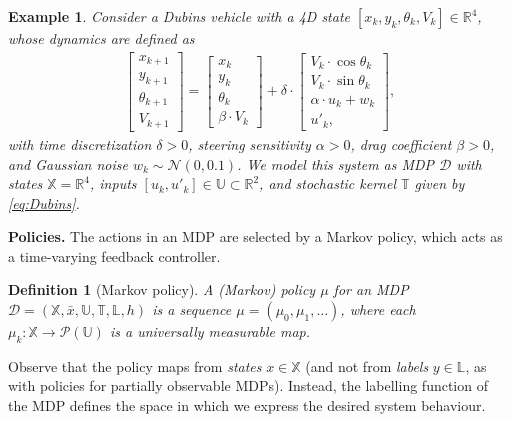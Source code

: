 \documentclass[letterpaper, 10 pt, conference]{ieeeconf}  %
\newtheorem{example}{Example}
\newtheorem{definition}{Definition}
\newcommand*{\policy}{\ensuremath{\mu}}
\newcommand*{\States}{\ensuremath{\mathbb{X}}}
\newcommand*{\Actions}{\ensuremath{\mathbb{U}}}
\newcommand*{\Labels}{\ensuremath{\mathbb{L}}}
\newcommand*{\initState}{\ensuremath{\bar{x}}}
\newcommand*{\transfunc}{\ensuremath{\mathbb{T}}}
\newcommand*{\labelfunc}{\ensuremath{h}}
\newcommand*{\mdp}{\ensuremath{\mathcal{D}}}
\newcommand*{\MDP}{\ensuremath{\tuple{\States,\initState,\Actions,\transfunc,\Labels,\labelfunc}}}
\newcommand*{\RR}{\mathbb{R}}
\newcommand*{\tuple}[1]{\left(#1\right)}
\newcommand*{\distr}[1]{\mathcal{P}(#1)}
\newcommand*{\Gauss}[2]{\ensuremath{\mathcal{N}(#1 , #2)}}
\begin{document}
\begin{example}
    \label{example}
    Consider a Dubins vehicle with a 4D state $[x_k, y_k, \theta_k, V_k] \in \RR^4$, whose dynamics are defined as
    \begin{align}
        \label{eq:Dubins}
        \begin{bmatrix}
            x_{k+1} \\ y_{k+1} \\ \theta_{k+1} \\ V_{k+1}
        \end{bmatrix} = \begin{bmatrix}
            x_k \\ y_k \\ \theta_k \\ \beta \cdot V_k
        \end{bmatrix} + \delta \cdot \begin{bmatrix}
            V_k \cdot \cos{\theta_k} \\
            V_k \cdot \sin{\theta_k} \\
            \alpha \cdot u_k + w_k \\
            u'_k,
        \end{bmatrix},
    \end{align}
    with time discretization $\delta > 0$, steering sensitivity $\alpha > 0$, drag coefficient $\beta > 0$, and Gaussian noise $w_k \sim \Gauss{0}{0.1}$.
    We model this system as MDP $\mdp$ with states $\States = \RR^4$, inputs $[u_k, u'_k] \in \Actions \subset \RR^2$, and stochastic kernel $\transfunc$ given by \cref{eq:Dubins}.
\end{example}

\textbf{Policies.}
The actions in an MDP are selected by a Markov policy, which acts as a time-varying feedback controller.

\begin{definition}[Markov policy]
    \label{def:policy}
    A (Markov) policy $\policy$ for an MDP $\mdp = \MDP$ is a sequence $\policy = (\policy_0, \policy_1, \ldots)$, where each $\policy_k \colon \States \to \distr{\Actions}$ is a universally measurable map.
\end{definition}

Observe that the policy maps from \emph{states} $x \in \States$ (and not from \emph{labels} $y \in \Labels$, as with policies for partially observable MDPs).
Instead, the labelling function of the MDP defines the space in which we express the desired system behaviour.
\end{document}
